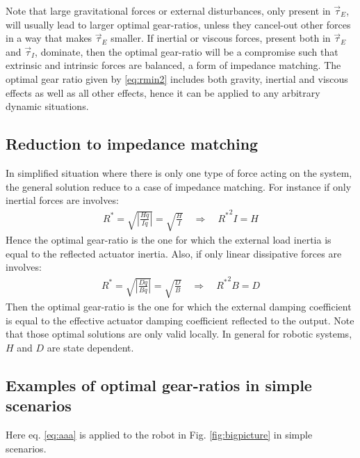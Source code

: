 Note that large gravitational forces or external disturbances, only present in $\vec{\tau}_{E}$, will usually lead to larger optimal gear-ratios, unless they cancel-out other forces in a way that makes $\vec{\tau}_{E}$ smaller. If inertial or viscous forces, present both in $\vec{\tau}_{E}$ and $\vec{\tau}_{I}$, dominate, then the optimal gear-ratio will be a compromise such that extrinsic and intrinsic forces are balanced, a form of impedance matching. The optimal gear ratio given by \eqref{eq:rmin2} includes both gravity, inertial and viscous effects as well as all other effects, hence it can be applied to any arbitrary dynamic situations.


\subsection{Reduction to impedance matching}
\label{sec:impreduc}

In simplified situation where there is only one type of force acting on the system, the general solution reduce to a case of impedance matching. For instance if only inertial forces are involves:
%
\begin{align}
	R^{*}  = \sqrt{ \left | \frac{H \ddot{q} }{ I \ddot{q} } \right |   } = \sqrt{ \frac{H}{I}}  \quad\Rightarrow\quad  {R^{*}}^2 I = H
 \label{eq:impmatchingHI}
\end{align}
%
Hence the optimal gear-ratio is the one for which the external load inertia is equal to the reflected actuator inertia. Also, if only linear dissipative forces are involves:
%
\begin{align}
	R^{*}  = \sqrt{ \left | \frac{D \dot{q} }{ B \dot{q} } \right |   } = \sqrt{ \frac{D}{B}}  \quad\Rightarrow\quad  {R^{*}}^2 B = D
 \label{eq:impmatchingDB}
\end{align}
%
Then the optimal gear-ratio is the one for which the external damping coefficient is equal to the effective actuator damping coefficient reflected to the output. Note that those optimal solutions are only valid locally. In general for robotic systems, $H$ and $D$ are state dependent. 


\newpage

\subsection{Examples of optimal gear-ratios in simple scenarios}
\label{sec:Examples}

Here eq. \eqref{eq:aaa} is applied to the robot in Fig. \ref{fig:bigpicture} in simple scenarios. 

